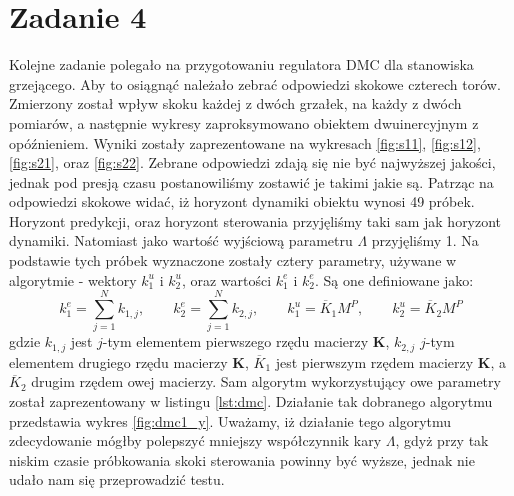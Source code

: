 \chapter{Zadanie 4}
Kolejne zadanie polegało na przygotowaniu regulatora DMC dla stanowiska
grzejącego. Aby to osiągnąć należało zebrać odpowiedzi skokowe czterech torów.
Zmierzony został wpływ skoku każdej z dwóch grzałek, na każdy z dwóch pomiarów,
a następnie wykresy zaproksymowano obiektem dwuinercyjnym z opóźnieniem.
Wyniki zostały zaprezentowane na wykresach \ref{fig:s11}, \ref{fig:s12}, \ref{fig:s21},
oraz \ref{fig:s22}. Zebrane odpowiedzi zdają się nie być najwyższej jakości,
jednak pod presją czasu postanowiliśmy zostawić je takimi jakie są. Patrząc
na odpowiedzi skokowe widać, iż horyzont dynamiki obiektu wynosi 49 próbek.
Horyzont predykcji, oraz horyzont sterowania przyjęliśmy taki sam jak horyzont
dynamiki. Natomiast jako wartość wyjściową parametru $\Lambda$ przyjęliśmy
1. Na podstawie tych próbek wyznaczone zostały cztery parametry, używane
w algorytmie - wektory $k^u_1$ i $k^u_2$, oraz wartości $k^e_1$ i $k^e_2$.
Są one definiowane jako:
\begin{equation}
  k^e_1 = \sum_{j=1}^Nk_{1,j}, \qquad k^e_2 = \sum_{j=1}^Nk_{2,j}, \qquad k^u_1 = \overline{K}_1M^P, \qquad k^u_2 = \overline{K}_2M^P
\end{equation}
gdzie $k_{1,j}$ jest $j$-tym elementem pierwszego rzędu macierzy $\bm{K}$,
$k_{2,j}$ $j$-tym elementem drugiego rzędu macierzy $\bm{K}$, $\overline{K}_1$
jest pierwszym rzędem macierzy $\bm{K}$, a $\overline{K}_2$ drugim rzędem owej
macierzy. Sam algorytm wykorzystujący owe parametry został zaprezentowany w
listingu \ref{lst:dmc}. Działanie tak dobranego algorytmu przedstawia wykres \ref{fig:dmc1_y}.
Uważamy, iż działanie tego algorytmu zdecydowanie mógłby polepszyć mniejszy
współczynnik kary $\Lambda$, gdyż przy tak niskim czasie próbkowania skoki
sterowania powinny być wyższe, jednak nie udało nam się przeprowadzić testu.

